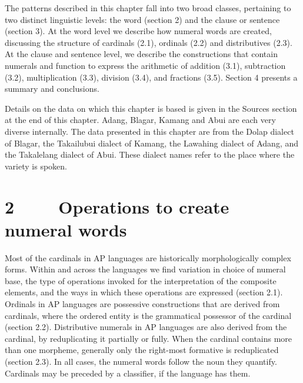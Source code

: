 The patterns described in this chapter fall into two broad classes, pertaining to two distinct linguistic levels: the word (section 2) and the clause or sentence (section 3). At the word level we describe how numeral words are created, discussing the structure of cardinals (2.1), ordinals (2.2) and distributives (2.3). At the clause and sentence level, we describe the constructions that contain numerals and function to express the arithmetic of addition (3.1), subtraction (3.2), multiplication (3.3), division (3.4), and fractions (3.5). Section 4 presents a summary and conclusions. 

Details on the data on which this chapter is based is given in the  Sources section at the end of this chapter. Adang, Blagar, Kamang and Abui are each very diverse internally. The data presented in this chapter are from the Dolap dialect of Blagar, the Takailubui dialect of Kamang, the Lawahing dialect of Adang, and the Takalelang dialect of Abui. These dialect names refer to the place where the variety is spoken.

\clearpage\section[2 \ \ \ \ Operations to create numeral words ]{2 \ \ \ \ Operations to create numeral words }
\hypertarget{RefHeading105230871885726}{}Most of the cardinals in AP languages are historically morphologically complex forms. Within and across the languages we find variation in choice of numeral base, the type of operations invoked for the interpretation of the composite elements, and the ways in which these operations are expressed (section 2.1). Ordinals in AP languages are possessive constructions that are derived from cardinals, where the ordered entity is the grammatical possessor of the cardinal (section 2.2). Distributive numerals in AP languages are also derived from the cardinal, by reduplicating it partially or fully. When the cardinal contains more than one morpheme, generally only the right-most formative is reduplicated (section 2.3).  In all cases, the numeral words follow the noun they quantify. Cardinals may be preceded by a classifier, if the language has them. 

